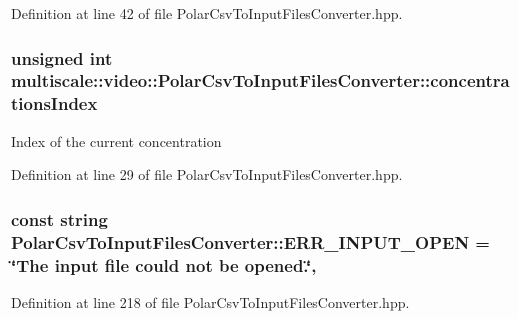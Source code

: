 Definition at line 42 of file Polar\-Csv\-To\-Input\-Files\-Converter.\-hpp.

\hypertarget{classmultiscale_1_1video_1_1PolarCsvToInputFilesConverter_afd9f17e6ba2dc46b920ab28538278362}{
\subsubsection[{concentrations\-Index}]{\setlength{\rightskip}{0pt plus 5cm}unsigned int multiscale\-::video\-::\-Polar\-Csv\-To\-Input\-Files\-Converter\-::concentrations\-Index\hspace{0.3cm}{\ttfamily [private]}}}\label{classmultiscale_1_1video_1_1PolarCsvToInputFilesConverter_afd9f17e6ba2dc46b920ab28538278362}
Index of the current concentration 

Definition at line 29 of file Polar\-Csv\-To\-Input\-Files\-Converter.\-hpp.

\hypertarget{classmultiscale_1_1video_1_1PolarCsvToInputFilesConverter_a4997621ae07f6696b1f0ec3cb11bbaeb}{
\subsubsection[{E\-R\-R\-\_\-\-I\-N\-P\-U\-T\-\_\-\-O\-P\-E\-N}]{\setlength{\rightskip}{0pt plus 5cm}const string Polar\-Csv\-To\-Input\-Files\-Converter\-::\-E\-R\-R\-\_\-\-I\-N\-P\-U\-T\-\_\-\-O\-P\-E\-N = \char`\"{}The input file could not be opened.\char`\"{}\hspace{0.3cm}{\ttfamily [static]}, {\ttfamily [private]}}}\label{classmultiscale_1_1video_1_1PolarCsvToInputFilesConverter_a4997621ae07f6696b1f0ec3cb11bbaeb}


Definition at line 218 of file Polar\-Csv\-To\-Input\-Files\-Converter.\-hpp.

